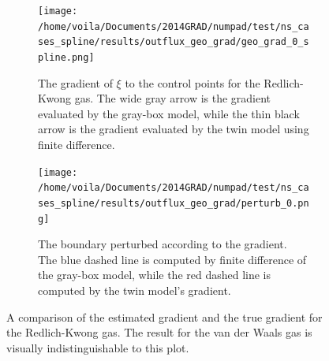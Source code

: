\begin{figure}[htbp]\begin{center}
    \begin{subfigure}[t]{.45\textwidth}
        \centering
        \texttt{[image: /home/voila/Documents/2014GRAD/numpad/test/ns\_cases\_spline/results/outflux\_geo\_grad/geo\_grad\_0\_spline.png]}
        \caption{
        The gradient of $\xi$ to the control points for the 
        Redlich-Kwong gas. 
        The wide gray arrow is the gradient evaluated by the gray-box model, while
        the thin black arrow is the gradient evaluated by the twin model using finite difference.
        }
        \label{fig: geo grad}
    \end{subfigure}
    \hspace{.5cm}
    \begin{subfigure}[t]{.45\textwidth}
        \centering
        \texttt{[image: /home/voila/Documents/2014GRAD/numpad/test/ns\_cases\_spline/results/outflux\_geo\_grad/perturb\_0.png]}
        \caption{
        The boundary perturbed according to the gradient. 
        The blue dashed line is computed by finite difference of the gray-box model, while the
        red dashed line is computed by the twin model's gradient.
        }
        \label{fig: geo grad perturb}
    \end{subfigure}
    \caption{A comparison of the estimated gradient and the true gradient for the Redlich-Kwong gas.
             The result for the van der Waals gas is visually indistinguishable to this plot.}
    \label{fig: geo grad all}
\end{center}\end{figure}

